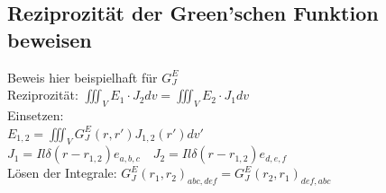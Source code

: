 \documentclass[english]{latex4ei/latex4ei_sheet}
\begin{document}
\begin{sectionbox}
    \subsection{Reziprozität der Green'schen Funktion beweisen}
    Beweis hier beispielhaft für $G_J^E$\\
    Reziprozität: $\iiint_V E_1\cdot J_2 dv = \iiint_V E_2\cdot J_1 dv$\\
    Einsetzen:\\
    $E_{1,2} = \iiint_V G_J^E(r,r') J_{1,2}(r') dv'$\\
    $J_{1} = Il \delta(r-r_{1,2})e_{a,b,c}\quad J_{2} = Il \delta(r-r_{1,2})e_{d,e,f}$\\
    Lösen der Integrale: $G_J^E(r_1,r_2)_{abc,def} = G_J^E(r_2,r_1)_{def,abc}$
\end{sectionbox}
\end{document}

